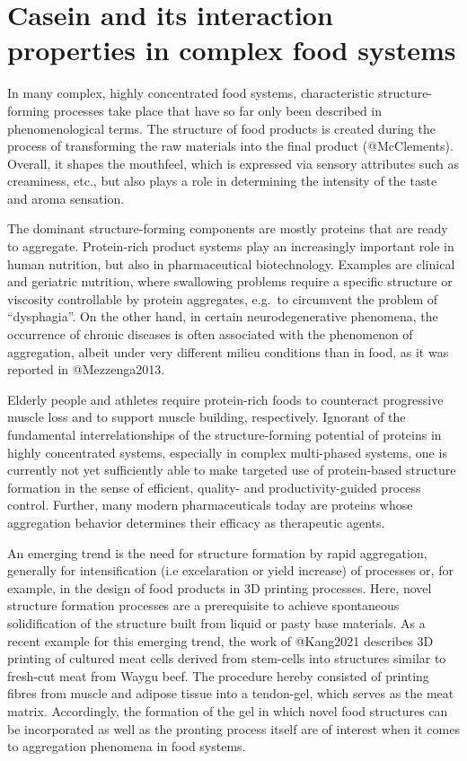\documentclass[
]{article}
\author{}
\date{\vspace{-2.5em}}
\begin{document}
\section{Casein and its interaction properties in complex food systems}

In many complex, highly concentrated food systems, characteristic
structure-forming processes take place that have so far only been
described in phenomenological terms. The structure of food products is
created during the process of transforming the raw materials into the
final product (@McClements). Overall, it shapes the mouthfeel, which is
expressed via sensory attributes such as creaminess, etc., but also
plays a role in determining the intensity of the taste and aroma
sensation.

The dominant structure-forming components are mostly proteins that are
ready to aggregate. Protein-rich product systems play an increasingly
important role in human nutrition, but also in pharmaceutical
biotechnology. Examples are clinical and geriatric nutrition, where
swallowing problems require a specific structure or viscosity
controllable by protein aggregates, e.g.~to circumvent the problem of
``dysphagia''. On the other hand, in certain neurodegenerative
phenomena, the occurrence of chronic diseases is often associated with
the phenomenon of aggregation, albeit under very different milieu
conditions than in food, as it was reported in @Mezzenga2013.

Elderly people and athletes require protein-rich foods to counteract
progressive muscle loss and to support muscle building, respectively.
Ignorant of the fundamental interrelationships of the structure-forming
potential of proteins in highly concentrated systems, especially in
complex multi-phased systems, one is currently not yet sufficiently able
to make targeted use of protein-based structure formation in the sense
of efficient, quality- and productivity-guided process control. Further,
many modern pharmaceuticals today are proteins whose aggregation
behavior determines their efficacy as therapeutic agents.

An emerging trend is the need for structure formation by rapid
aggregation, generally for intensification (i.e excelaration or yield
increase) of processes or, for example, in the design of food products
in 3D printing processes. Here, novel structure formation processes are
a prerequisite to achieve spontaneous solidification of the structure
built from liquid or pasty base materials. As a recent example for this
emerging trend, the work of @Kang2021 describes 3D printing of cultured
meat cells derived from stem-cells into structures similar to fresh-cut
meat from Waygu beef. The procedure hereby consisted of printing fibres
from muscle and adipose tissue into a tendon-gel, which serves as the
meat matrix. Accordingly, the formation of the gel in which novel food
structures can be incorporated as well as the pronting process itself
are of interest when it comes to aggregation phenomena in food systems.
\end{document}

